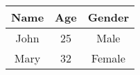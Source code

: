 \begin{tabular}{|c|c|c|}
\hline
Name & Age & Gender \\
\hline
John & 25 & Male \\
\hline
Mary & 32 & Female \\
\hline
\end{tabular}